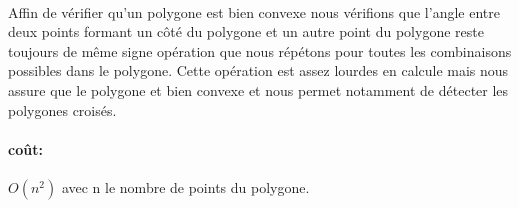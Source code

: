 \paragraph{}
Affin de vérifier qu'un polygone est bien convexe nous vérifions que l'angle entre deux points formant un côté du polygone et un autre point du polygone reste toujours de même signe opération que nous répétons pour toutes les combinaisons possibles dans le polygone. Cette opération est assez lourdes en calcule mais nous assure que le polygone et bien convexe et nous permet notamment de détecter les polygones croisés.
\paragraph{coût: }
\(O(n^2)\) avec n le nombre de points du polygone.




